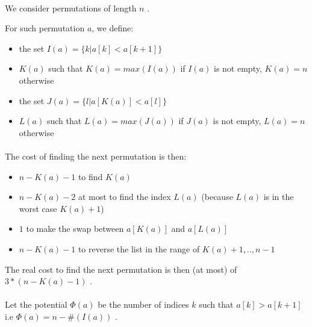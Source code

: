 

\paragraph{}
We consider permutations of length $n$ .

For such permutation $a$, we define:
\begin{itemize}
\item{} the set $I(a)=\{k | a[k]<a[k+1]\}$
\item{} $K(a)$ such that $K(a)= max(I(a))$ if $I(a)$ is not empty, $K(a)=n$ otherwise
\item{} the set $J(a)=\{l | a[K(a)]<a[l]\}$
\item{} $L(a)$ such that $L(a) = max(J(a))$ if $J(a)$ is not empty, $L(a)=n$ otherwise
\end{itemize}

\paragraph{}
The cost of finding the next permutation is then:
\begin{itemize}
\item{} $n-K(a)-1$ to find $K(a)$
\item{} $n-K(a)-2$ at most to find the index $L(a)$ (because $L(a)$ is in the worst case $K(a)+1$)
\item{} $1$ to make the swap between $a[K(a)]$ and $a[L(a)]$
\item{} $n-K(a)-1$ to reverse the list in the range of $K(a)+1,..,n-1$
\end{itemize}
The real cost to find the next permutation is then (at most) of $3*(n-K(a)-1)$ .

\paragraph{}
Let the potential $\Phi(a)$ be the number of indices $k$ such that $a[k]>a[k+1]$
\newline
i.e $\Phi(a)=n-\#(I(a))$ .

